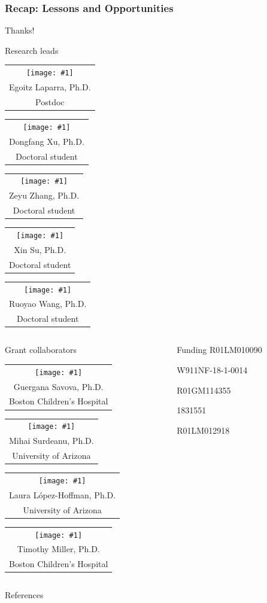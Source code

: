 \documentclass[14pt,aspectratio=169]{beamer}
\newcommand{\headshot}[3]{{\tiny\setlength{\tabcolsep}{0pt}%
\begin{tabular}{c}
\texttt{[image: \#1]} \\
#2 \\
#3
\end{tabular}}}
\newcommand{\raisegraphics}[3]{\raisebox{-#1\height}{\texttt{[image: \#3]}}}
\newcommand{\funding}[2]{\raisegraphics{.2}{height=.05\textheight}{#1} #2}
\begin{document}
\begin{frame}
    \frametitle{Recap: Lessons and Opportunities}
    \tableofcontents
\end{frame}

\begin{frame}{Thanks!}
\begin{block}{Research leads}
\headshot{people/laparra-egoitz.jpg}{Egoitz Laparra, Ph.D.}{Postdoc}
\qquad
\headshot{people/xu-dongfang.jpeg}{Dongfang Xu, Ph.D.}{Doctoral student}
\qquad
\headshot{people/zhang-zeyu.png}{Zeyu Zhang, Ph.D.}{Doctoral student}
\qquad
\headshot{people/su-xin.jpg}{Xin Su, Ph.D.}{Doctoral student}
\qquad
\headshot{people/wang-ruoyao.png}{Ruoyao Wang, Ph.D.}{Doctoral student}
\end{block}
\begin{columns}
\begin{column}{0.65\textwidth}
\begin{block}{Grant collaborators}
\headshot{people/savova-guergana.jpg}{Guergana Savova, Ph.D.}{Boston Children's Hospital}
\headshot{people/surdeanu-mihai.jpeg}{Mihai Surdeanu, Ph.D.}{University of Arizona}
\headshot{people/lopez-hoffmann-laura.jpg}{Laura L\'{o}pez-Hoffman, Ph.D.}{University of Arizona}
\headshot{people/miller-timothy.jpg}{Timothy Miller, Ph.D.}{Boston Children's Hospital}
\end{block}
\end{column}
\hfill
\begin{column}{0.3\textwidth}
\begin{block}{Funding}
\scriptsize
\funding{funding/nih_nlm.png}{R01LM010090}

\funding{funding/darpa.png}{W911NF-18-1-0014}

\funding{funding/nih_nigms.jpg}{R01GM114355}

\funding{funding/nsf.png}{1831551}

\funding{funding/nih_nlm.png}{R01LM012918}
\end{block}
\end{column}
\end{columns}
\end{frame}


\appendix

\begin{frame}[allowframebreaks]{References}
\printbibliography
\end{frame}
\end{document}
